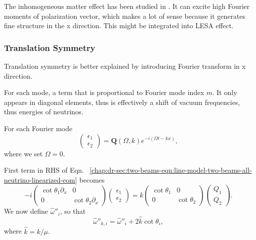 The inhomogeneous matter effect has been studied in \cite{Mangano2014}. It can excite high Fourier moments of polarization vector, which makes a lot of sense because it generates fine structure in the x direction. This might be integrated into LESA effect.



\subsubsection{Translation Symmetry}


Translation symmetry is better explained by introducing Fourier transform in x direction.

For each mode, a term that is proportional to Fourier mode index $m$. It only appears in diagonal elements, thus is effectively a shift of vacuum frequencies, thus energies of neutrinos.

For each Fourier mode
\begin{equation*}
   \begin{pmatrix}
   \epsilon_1 \\
   \epsilon_2
   \end{pmatrix} =  \mathbf Q(\Omega,k) e^{-i(\Omega t- k x)},
\end{equation*}
where we set $\Omega=0$.

First term in RHS of Eqn.~ \ref{chap:dr-sec:two-beams-eqn:line-model-two-beams-all-neutrino-linearized-eom} becomes
\begin{equation*}
   - i \begin{pmatrix}\cot\theta_1\partial_x & 0 \\
   0 & \cot\theta_2 \partial_x
   \end{pmatrix} \begin{pmatrix}
   \epsilon_1 \\
   \epsilon_2
   \end{pmatrix} = k \begin{pmatrix}\cot\theta_1 & 0 \\
   0 & \cot\theta_2
   \end{pmatrix} \begin{pmatrix}
   Q_1 \\
   Q_2
   \end{pmatrix}.
\end{equation*}
We now define $\hat\omega''_i$, so that
\begin{equation*}
   \hat\omega''_{k,i} = \hat \omega''_i + 2\hat k\cot\theta_i,
\end{equation*}
where $\hat k=k/\mu$.

